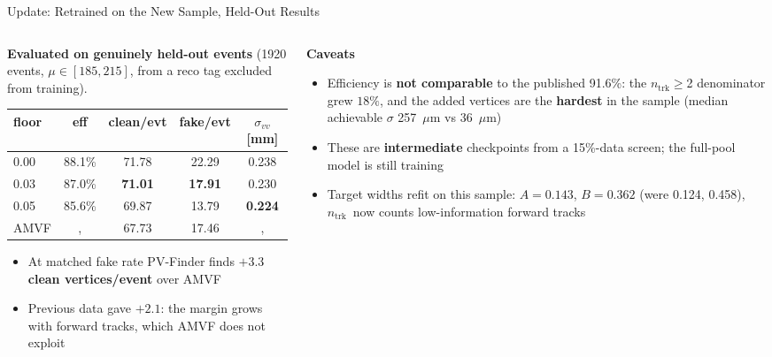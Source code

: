 \documentclass[xcolor=table,aspectratio=169]{beamer}
\newcommand{\ntrk}{\ensuremath{n_\mathrm{trk}}}
\begin{document}
\begin{frame}{Update: Retrained on the New Sample, Held-Out Results}
    \begin{columns}[T]
        \begin{column}{0.56\linewidth}
            \textbf{Evaluated on genuinely held-out events} (1920 events, $\mu\in[185,215]$,
            from a reco tag excluded from training).
            \vspace{0.3em}
            {\footnotesize
            \begin{tabular}{lcccc}
                \hline
                floor & eff & clean/evt & fake/evt & $\sigma_{vv}$ [mm] \\
                \hline
                0.00 & 88.1\% & 71.78 & 22.29 & 0.238 \\
                0.03 & 87.0\% & \textbf{71.01} & \textbf{17.91} & 0.230 \\
                0.05 & 85.6\% & 69.87 & 13.79 & \textbf{0.224} \\
                \hline
                AMVF &, & 67.73 & 17.46 &, \\
                \hline
            \end{tabular}}
            \vspace{0.5em}
            \begin{itemize}\setlength\itemsep{0.25em}
                \item At matched fake rate PV-Finder finds
                      \textbf{$+3.3$ clean vertices/event} over AMVF
                \item Previous data gave \textbf{$+2.1$}: the margin grows with
                      forward tracks, which AMVF does not exploit
            \end{itemize}
        \end{column}
        \begin{column}{0.42\linewidth}
            \textbf{Caveats}
            \begin{itemize}\footnotesize\setlength\itemsep{0.25em}
                \item Efficiency is \textbf{not comparable} to the published
                      91.6\%: the \ntrk$\ge$2 denominator grew $18\%$, and the
                      added vertices are the \textbf{hardest} in the sample
                      (median achievable $\sigma$ 257~$\mu$m vs 36~$\mu$m)
                \item These are \textbf{intermediate} checkpoints from a 15\%-data
                      screen; the full-pool model is still training
                \item Target widths refit on this sample:
                      $A\!=\!0.143$, $B\!=\!0.362$ (were 0.124, 0.458), \ntrk\ now counts low-information forward tracks
            \end{itemize}
        \end{column}
    \end{columns}
\end{frame}
\end{document}
